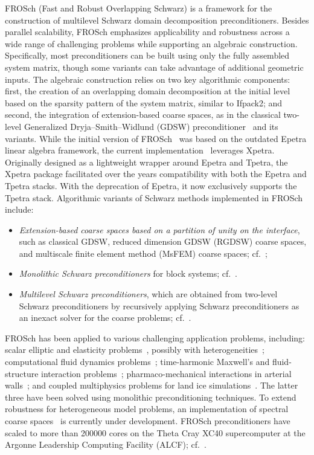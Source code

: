 FROSch (Fast and Robust Overlapping Schwarz) is a framework for the construction of multilevel Schwarz domain decomposition preconditioners. Besides parallel scalability, FROSch emphasizes applicability and robustness across a wide range of challenging problems while supporting an algebraic construction. Specifically, most preconditioners can be built using only the fully assembled system matrix, though some variants can take advantage of additional geometric inputs. The algebraic construction relies on two key algorithmic components: first, the creation of an overlapping domain decomposition at the initial level based on the sparsity pattern of the system matrix, similar to Ifpack2; and second, the integration of extension-based coarse spaces, as in the classical two-level Generalized Dryja--Smith--Widlund (GDSW) preconditioner~\cite{dohrmann_domain_2008} and its variants. While the initial version of FROSch~\cite{heinlein_parallel_2016} was based on the outdated Epetra linear algebra framework, the current implementation~\cite{heinlein_frosch_2020} leverages Xpetra. Originally designed as a lightweight wrapper around Epetra and Tpetra, the Xpetra package facilitated over the years compatibility with both the Epetra and Tpetra stacks. With the deprecation of Epetra, it now exclusively supports the Tpetra stack. Algorithmic variants of Schwarz methods implemented in FROSch include:
\begin{itemize}
	\item \emph{Extension-based coarse spaces based on a partition of unity on the interface}, such as classical GDSW, reduced dimension GDSW (RGDSW) coarse spaces, and multiscale finite element method (MsFEM) coarse spaces; cf.~\cite{heinlein_parallel_2016,heinlein_improving_2018};
	\item \emph{Monolithic Schwarz preconditioners} for block systems; cf.~\cite{heinlein_monolithic_2019}.
	\item \emph{Multilevel Schwarz preconditioners}, which are obtained from two-level Schwarz preconditioners by recursively applying Schwarz preconditioners as an inexact solver for the coarse problems; cf.~\cite{heinlein_parallel_2022}.
\end{itemize}

FROSch has been applied to various challenging application problems, including: scalar elliptic and elasticity problems~\cite{heinlein_parallel_2016}, possibly with heterogeneities~\cite{alves2024computationalstudyalgebraiccoarse}; computational fluid dynamics problems~\cite{heinlein_monolithic_2019,heinlein_comparison_2025}; time-harmonic Maxwell's and fluid-structure interaction problems~\cite{heinlein2024couplingdealiifroschsustainable}; pharmaco-mechanical interactions in arterial walls~\cite{balzani_computational_nodate}; and coupled multiphysics problems for land ice simulations~\cite{heinlein_frosch_2022}. The latter three have been solved using monolithic preconditioning techniques. To extend robustness for heterogeneous model problems, an implementation of spectral coarse spaces~\cite{heinlein_adaptive_2019} is currently under development. FROSch preconditioners have scaled to more than \num{200000} cores on the Theta Cray XC40 supercomputer at the Argonne Leadership Computing Facility (ALCF); cf.~\cite{heinlein_parallel_2022}.

